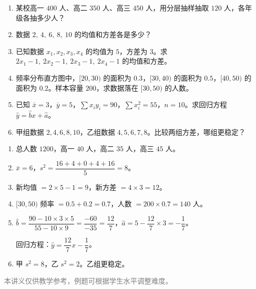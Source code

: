 \documentclass[12pt, a4paper]{ctexart}
\begin{document}
\begin{enumerate}
  \item 某校高一 $400$ 人、高二 $350$ 人、高三 $450$ 人，用分层抽样抽取 $120$ 人，各年级各抽多少人？

  \item 数据 $2,\ 4,\ 6,\ 8,\ 10$ 的均值和方差各是多少？

  \item 已知数据 $x_1, x_2, x_3, x_4$ 的均值为 $5$，方差为 $3$。求 $2x_1-1,\ 2x_2-1,\ 2x_3-1,\ 2x_4-1$ 的均值和方差。

  \item 频率分布直方图中，$[20,30)$ 的面积为 $0.3$，$[30,40)$ 的面积为 $0.5$，$[40,50)$ 的面积为 $0.2$。样本容量 $200$，求数据落在 $[30,50)$ 的人数。

  \item 已知 $\bar{x}=3$，$\bar{y}=5$，$\sum x_i y_i=90$，$\sum x_i^2=55$，$n=10$。求回归方程 $\hat{y}=\hat{b}x+\hat{a}$。

  \item 甲组数据 $2,4,6,8,10$，乙组数据 $4,5,6,7,8$。比较两组方差，哪组更稳定？
\end{enumerate}

\begin{knowledgebox}[参考答案]
\begin{enumerate}
  \item 总人数 $1200$，高一 $40$ 人，高二 $35$ 人，高三 $45$ 人。

  \item $\bar{x} = 6$，$s^2 = \dfrac{16+4+0+4+16}{5} = 8$。

  \item 新均值 $= 2\times5-1 = 9$，新方差 $= 4\times3 = 12$。

  \item $[30,50)$ 频率 $= 0.5+0.2=0.7$，人数 $= 200\times0.7 = 140$ 人。

  \item $\hat{b} = \dfrac{90-10\times3\times5}{55-10\times9} = \dfrac{-60}{-35} = \dfrac{12}{7}$，$\hat{a} = 5-\dfrac{12}{7}\times3 = -\dfrac{1}{7}$。

  回归方程：$\hat{y} = \dfrac{12}{7}x - \dfrac{1}{7}$。

  \item 甲 $s^2 = 8$，乙 $s^2 = 2$。乙组更稳定。
\end{enumerate}
\end{knowledgebox}

\vfill
\begin{center}
\small\textcolor{gray}{本讲义仅供教学参考，例题可根据学生水平调整难度。}
\end{center}
\end{document}

